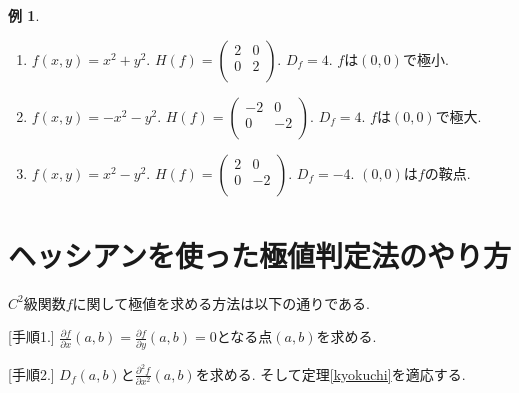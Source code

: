 \documentclass[dvipdfmx,a4paper,11pt]{article}
\theoremstyle{definition}
\newtheorem{exa}[thm]{例}
\newcommand{\pdrv}[2]{\frac{\partial #1}{\partial #2}}
\begin{document}
\begin{exa}
\begin{enumerate}
\item $f(x,y)=x^2 + y^2$. 
$H(f) = \left(\begin{array}{cc} 2& 0\\ 
0& 2 \\ \end{array} \right)$.
$D_f =4$.
$f$は$(0,0)$で極小.

\item $f(x,y)=-x^2 - y^2$.
$H(f) = \left(\begin{array}{cc} -2& 0\\ 
0& -2 \\ \end{array} \right)$.
$D_f =4$.
$f$は$(0,0)$で極大.

\item $f(x,y)=x^2 -y^2$.
$H(f) = \left(\begin{array}{cc} 2& 0\\ 
0& -2 \\ \end{array} \right)$.
$D_f =-4$.
$(0,0)$は$f$の鞍点.

\end{enumerate}

\end{exa}

\section{ヘッシアンを使った極値判定法のやり方}
    
    
 \begin{tcolorbox}[
    colback = white,
    colframe = green!35!black,
    fonttitle = \bfseries,
    breakable = true]
    
$C^2$級関数$f$に関して極値を求める方法は以下の通りである.

 \begin{description}
 
\item{[手順1.]} $\pdrv{f}{x}(a,b) = \pdrv{f}{y}(a,b) = 0$となる点$(a,b)$を求める.

\item{[手順2.]} $D_f(a,b)$と$\pdrv{^2f}{x^2}(a,b) $を求める.
そして定理\ref{kyokuchi}を適応する.

 \end{description}
    \end{tcolorbox}
    
\end{document}
